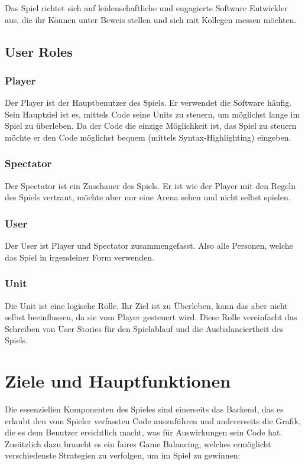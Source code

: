 \documentclass[11pt,a4paper]{scrartcl}
\let\oldsection\section
\renewcommand\section{\clearpage\oldsection}
\begin{document}
Das Spiel richtet sich auf leidenschaftliche und engagierte Software Entwickler aus, die ihr Können unter Beweis stellen und sich mit Kollegen messen möchten.

\subsection{User Roles}
\subsubsection{Player}
Der Player ist der Hauptbenutzer des Spiels. Er verwendet die Software häufig. Sein Hauptziel ist es, mittels Code seine Units zu steuern, um möglichst lange im Spiel zu überleben. Da der Code die einzige Möglichkeit ist, das Spiel zu steuern möchte er den Code möglichst bequem (mittels Syntax-Highlighting) eingeben.
\subsubsection{Spectator}
Der Spectator ist ein Zuschauer des Spiels. Er ist wie der Player mit den Regeln des Spiels vertraut, möchte aber nur eine Arena sehen und nicht selbst spielen.
\subsubsection{User}
Der User ist Player und Spectator zusammengefasst. Also alle Personen, welche das Spiel in irgendeiner Form verwenden.
\subsubsection{Unit}
Die Unit ist eine logische Rolle. Ihr Ziel ist zu Überleben, kann das aber nicht selbst beeinflussen, da sie vom Player gesteuert wird. Diese Rolle vereinfacht das Schreiben von User Stories für den Spielablauf und die Ausbalanciertheit des Spiels.

\section{Ziele und Hauptfunktionen}

Die essenziellen Komponenten des Spieles sind einerseits das Backend, das es erlaubt den vom Spieler verfassten Code auszuführen und andererseits die Grafik, die es dem Benutzer ersichtlich macht, was für Auswirkungen sein Code hat. Zusätzlich dazu braucht es ein faires Game Balancing, welches ermöglicht verschiedenste Strategien zu verfolgen, um im Spiel zu gewinnen:
\end{document}
